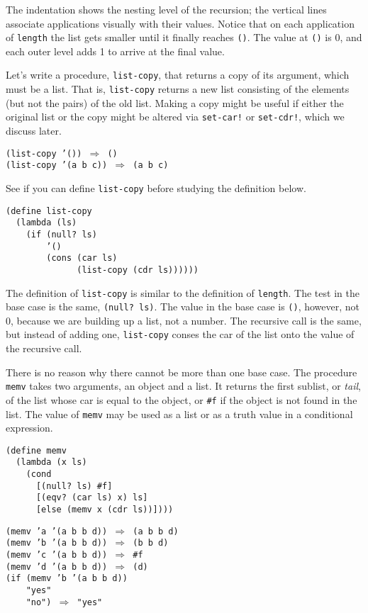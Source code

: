 The indentation shows the nesting level of the recursion; the vertical
lines associate applications visually with their values.
Notice that on each application of \texttt{length} the list gets smaller until
it finally reaches \texttt{()}.
The value at \texttt{()} is 0, and each outer level adds 1 to arrive
at the final value.


Let's write a procedure, \label{start_s140}\texttt{list-copy}, that returns a copy of its
argument, which must be a list.
That is, \texttt{list-copy} returns a new list consisting of the elements
(but not the pairs) of the old list.
Making a copy might be useful if either the original list or the copy
might be altered via \texttt{set-car!} or \texttt{set-cdr!}, which we discuss later.


\begin{alltt}
(list-copy '()) \(\Rightarrow\) ()
(list-copy '(a b c)) \(\Rightarrow\) (a b c)
\end{alltt}


See if you can define \texttt{list-copy} before studying the definition below.


\begin{alltt}
(define list-copy
  (lambda (ls)
    (if (null? ls)
        '()
        (cons (car ls)
              (list-copy (cdr ls))))))
\end{alltt}


The definition of \texttt{list-copy} is similar to the definition of
\texttt{length}.
The test in the base case is the same, \texttt{(null? ls)}.
The value in the base case is \texttt{()}, however, not 0, because we
are building up a list, not a number.
The recursive call is the same, but instead of adding one, \texttt{list-copy}
conses the car of the list onto the value of the recursive call.


There is no reason why there cannot be more than one base case.
The procedure \label{start_s141}\texttt{memv} takes two arguments, an object and a list.
It returns the first sublist, or \textit{tail},
of the list whose car is equal to the object, or
\texttt{\#{}f} if the object is not found in the list.
The value of \texttt{memv} may be used as a list or as a truth value
in a conditional expression.


\begin{alltt}
(define memv
  (lambda (x ls)
    (cond
      [(null? ls) \#{}f]
      [(eqv? (car ls) x) ls]
      [else (memv x (cdr ls))])))
\end{alltt}


\begin{alltt}
(memv 'a '(a b b d)) \(\Rightarrow\) (a b b d)
(memv 'b '(a b b d)) \(\Rightarrow\) (b b d)
(memv 'c '(a b b d)) \(\Rightarrow\) \#{}f
(memv 'd '(a b b d)) \(\Rightarrow\) (d)
(if (memv 'b '(a b b d))
    "yes"
    "no") \(\Rightarrow\) "yes"
\end{alltt}


